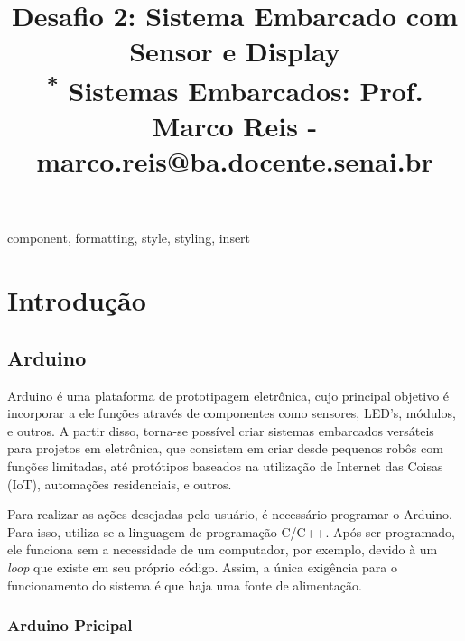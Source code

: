 \documentclass[conference]{IEEEtran}
\begin{document}
\title{Desafio 2: Sistema Embarcado com Sensor e Display\\
{\footnotesize \textsuperscript{*} Sistemas Embarcados: Prof. Marco Reis - marco.reis@ba.docente.senai.br}
}

\author{
}

\maketitle

\begin{abstract}

\end{abstract}
    
\begin{IEEEkeywords}
    component, formatting, style, styling, insert
\end{IEEEkeywords}
    
\section{Introdução}
\subsection{Arduino}

    Arduino é uma plataforma de prototipagem eletrônica, cujo principal objetivo é incorporar a ele 
funções através de componentes como sensores, LED's, módulos, e outros. A partir disso, torna-se 
possível criar sistemas embarcados versáteis para projetos em eletrônica, que consistem em criar desde 
pequenos robôs com funções limitadas, até protótipos baseados na utilização de Internet das Coisas (IoT),
automações residenciais, e outros.

    Para realizar as ações desejadas pelo usuário, é necessário programar o Arduino. Para isso, utiliza-se 
a linguagem de programação C/C++. Após ser programado, ele funciona sem a necessidade de um computador, por
exemplo, devido à um \emph{loop} que existe em seu próprio código. Assim, a única exigência para o
funcionamento do sistema é que haja uma fonte de alimentação.

\subsubsection{Arduino Pricipal}
\end{document}
